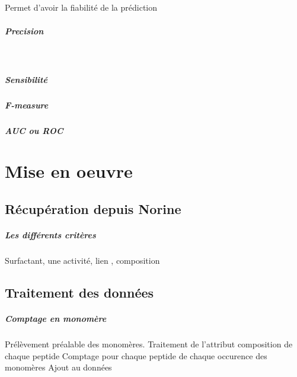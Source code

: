 \documentclass[a4paper,10pt]{report}
\begin{document}
	     \paragraph{}
	     
	     Permet d'avoir la fiabilité de la prédiction
	     
	     \paragraph{Precision}
	      
	      ~\\
	      
	     
	     \paragraph{Sensibilité}
	     
	     \paragraph{F-measure}
	     
	     \paragraph{AUC ou ROC}
		
  
  \chapter{Mise en oeuvre}

  
    \section{Récupération depuis Norine}
    
	\paragraph{Les différents critères}
	    Surfactant, une activité, lien , composition
	    
   
    \section{Traitement des données}
	
	\paragraph{Comptage en monomère}
	    Prélèvement préalable des monomères.
	    Traitement de l'attribut composition de chaque peptide
	    Comptage pour chaque peptide de chaque occurence des monomères
	    Ajout au données
	    
\end{document}
